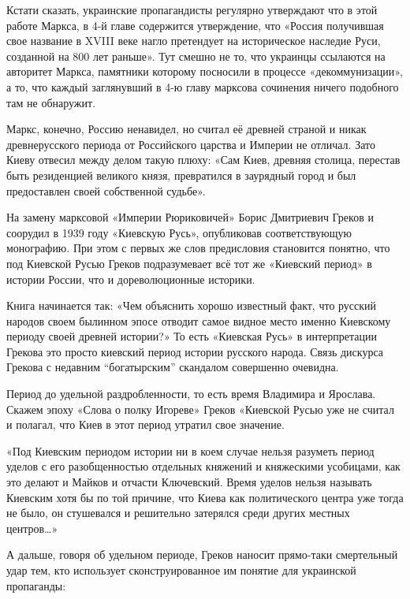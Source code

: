 Кстати сказать, украинские пропагандисты регулярно утверждают что в этой работе
Маркса, в 4-й главе содержится утверждение, что «Россия получившая свое
название в XVIII веке нагло претендует на историческое наследие Руси, созданной
на 800 лет раньше». Тут смешно не то, что украинцы ссылаются на авторитет
Маркса, памятники которому посносили в процессе «декоммунизации», а то, что
каждый заглянувший в 4-ю главу марксова сочинения ничего подобного там не
обнаружит.


Маркс, конечно, Россию ненавидел, но считал её древней страной и никак
древнерусского периода от Российского царства и Империи не отличал. Зато Киеву
отвесил между делом такую плюху: «Сам Киев, древняя столица, перестав быть
резиденцией великого князя, превратился в заурядный город и был предоставлен
своей собственной судьбе».

На замену марксовой «Империи Рюриковичей» Борис Дмитриевич Греков и соорудил в
1939 году «Киевскую Русь», опубликовав соответствующую монографию. При этом с
первых же слов предисловия становится понятно, что под Киевской Русью Греков
подразумевает всё тот же «Киевский период» в истории России, что и
дореволюционные историки.

Книга начинается так: «Чем объяснить хорошо известный факт, что русский народов
своем былинном эпосе отводит самое видное место именно Киевскому периоду своей
древней истории?» То есть «Киевская Русь» в интерпретации Грекова это просто
киевский период истории русского народа. Связь дискурса Грекова с недавним
\enquote{богатырским} скандалом совершенно очевидна.

Период до удельной раздробленности, то есть время Владимира и Ярослава. Скажем
эпоху «Слова о полку Игореве» Греков «Киевской Русью уже не считал и полагал,
что Киев в этот период утратил свое значение.


«Под Киевским периодом истории ни в коем случае нельзя разуметь период уделов с
его разобщенностью отдельных княжений и княжескими усобицами, как это делают и
Майков и отчасти Ключевский. Время уделов нельзя называть Киевским хотя бы по
той причине, что Киева как политического центра уже тогда не было, он
стушевался и решительно затерялся среди других местных центров…»

А дальше, говоря об удельном периоде, Греков наносит прямо-таки смертельный
удар тем, кто использует сконструированное им понятие для украинской
пропаганды:

